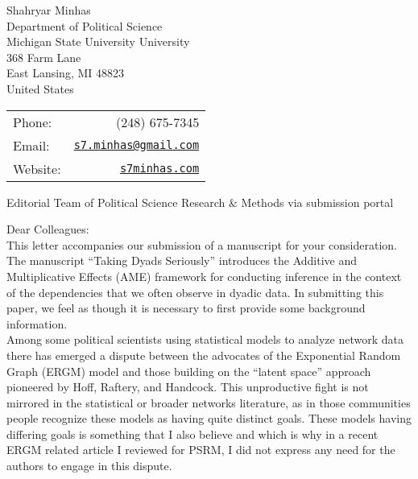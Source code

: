\documentclass[letterpaper]{article}
\begin{document}
\thispagestyle{empty}

\begin{minipage}{0.64\linewidth}
Shahryar Minhas \\
Department of Political Science \\
Michigan State University University \\
368 Farm Lane \\
East Lansing, MI 48823\\
United States
\end{minipage}
\begin{minipage}{0.45\linewidth}
  \begin{tabular}{lr}
    Phone: & (248) 675-7345 \\
    Email: & \href{mailto:s7.minhas@gmail.com}{\tt s7.minhas@gmail.com}  \\
    Website:& \href{http://s7minhas.com/}{\tt s7minhas.com}
  \end{tabular}
\end{minipage}

\vspace{.5in}

{Editorial Team of Political Science Research \& Methods via submission portal}

\vspace{0.25in}

Dear Colleagues:\\[1ex]

This letter accompanies our submission of a manuscript for your consideration. The manuscript ``Taking Dyads Seriously'' introduces the Additive and Multiplicative Effects (AME) framework for conducting inference in the context of the dependencies that we often observe in dyadic data. In submitting this paper, we feel as though it is necessary to first provide some background information. \\[1ex]

Among some political scientists using statistical models to analyze network data there has emerged a dispute between the advocates of the Exponential Random Graph (ERGM) model and those building on the ``latent space'' approach pioneered by Hoff, Raftery, and Handcock. This unproductive fight is not mirrored in the statistical or broader networks literature, as in those communities people recognize these models as having quite distinct goals. These models having differing goals is something that I also believe and which is why in a recent ERGM related article I reviewed for PSRM, I did not express any need for the authors to engage in this dispute. \\[1ex] 
\end{document}
